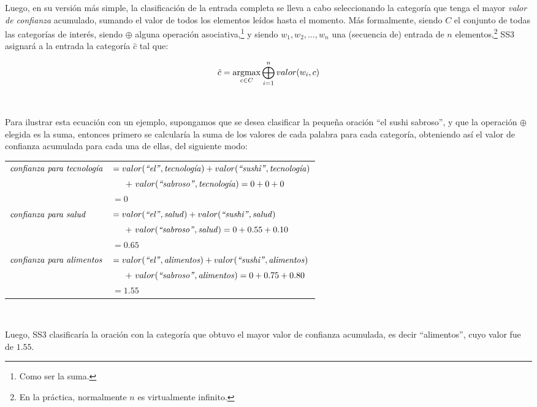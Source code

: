 Luego, en su versión más simple, la clasificación de la entrada completa se lleva a cabo seleccionando la categoría que tenga el mayor \emph{valor de confianza} acumulado, sumando el valor de todos los elementos leídos hasta el momento. Más formalmente, siendo $C$ el conjunto de todas las categorías de interés, siendo $\oplus$ alguna operación asociativa,\footnote{Como ser la suma.} y siendo $w_1,w_2,\dots,w_n$ una (secuencia de) entrada de $n$ elementos,\footnote{En la práctica, normalmente $n$ es virtualmente infinito.} SS3 asignará a la entrada la categoría $\hat{c}$ tal que:


$$\hat{c}=\operatorname*{argmax}_{c\in C} \bigoplus_{i=1}^{n} valor(w_i,c)$$

\

Para ilustrar esta ecuación con un ejemplo, supongamos que se desea clasificar la pequeña oración ``el sushi sabroso'', y que la operación $\oplus$ elegida es la suma, entonces primero se calcularía la suma de los valores de cada palabra para cada categoría, obteniendo así el valor de confianza acumulada para cada una de ellas, del siguiente modo: 

\begin{tabular}{l@{}l}%
$\text{\emph{confianza para tecnología}}$ & $=  valor(\text{\emph{``el''}}, \text{\emph{tecnología}}) + valor(\text{\emph{``sushi''}}, \text{\emph{tecnología}})$ \\
& \ \ \ $ +\ valor(\text{\emph{``sabroso''}}, \text{\emph{tecnología}}) = 0 + 0 + 0 $\\
& $= 0$\\
$\text{\emph{confianza para salud}}$ & $=  valor(\text{\emph{``el''}}, \text{\emph{salud}}) + valor(\text{\emph{``sushi''}}, \text{\emph{salud}})$ \\
& \ \ \ $ +\ valor(\text{\emph{``sabroso''}}, \text{\emph{salud}}) = 0 + 0.55 + 0.10 $\\
& $= 0.65$\\
$\text{\emph{confianza para alimentos}}$ & $=  valor(\text{\emph{``el''}}, \text{\emph{alimentos}}) + valor(\text{\emph{``sushi''}}, \text{\emph{alimentos}})$ \\
& \ \ \ $ +\ valor(\text{\emph{``sabroso''}}, \text{\emph{alimentos}}) = 0 + 0.75 + 0.80$\\
& $= 1.55$ \\
\end{tabular}

\

Luego, SS3 clasificaría la oración con la categoría que obtuvo el mayor valor de confianza acumulada, es decir ``alimentos'', cuyo valor fue de $1.55$.

